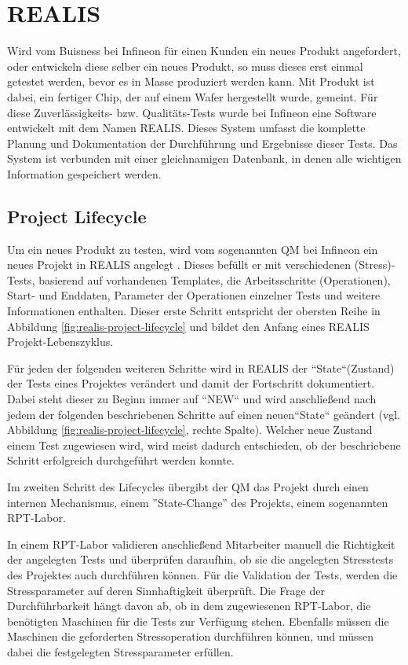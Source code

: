 \section{REALIS}\label{Sec:REALIS}
Wird vom Buisness bei Infineon für einen Kunden ein neues Produkt angefordert, oder entwickeln diese selber ein neues Produkt, so muss dieses erst einmal getestet werden, bevor es in Masse produziert werden kann. Mit Produkt ist dabei, ein fertiger Chip, der auf einem Wafer hergestellt wurde, gemeint. Für diese Zuverlässigkeits- bzw. Qualitäts-Tests wurde bei Infineon eine Software entwickelt mit dem Namen \gls{REALIS}. Dieses System umfasst die komplette Planung und Dokumentation der Durchführung und Ergebnisse dieser Tests. Das System ist verbunden mit einer gleichnamigen Datenbank, in denen alle wichtigen Information gespeichert werden.

\subsection{Project Lifecycle}\label{Subsec:project-lifecycle}
Um ein neues Produkt zu testen, wird vom sogenannten \gls{QM} bei Infineon ein neues Projekt in \gls{REALIS} angelegt . Dieses befüllt er mit verschiedenen (Stress)-Tests, basierend auf vorhandenen Templates, die Arbeitsschritte (Operationen), Start- und Enddaten, Parameter der Operationen einzelner Tests und weitere Informationen enthalten. Dieser erste Schritt entspricht der obersten Reihe in Abbildung \ref{fig:realis-project-lifecycle} und bildet den Anfang eines REALIS Projekt-Lebenszyklus. 

Für jeden der folgenden weiteren Schritte wird in \gls{REALIS} der ``State``(Zustand) der Tests eines Projektes verändert und damit der Fortschritt dokumentiert. Dabei steht dieser zu Beginn immer auf  ``NEW`` und wird anschließend nach jedem der folgenden beschriebenen Schritte auf einen neuen``State`` geändert (vgl. Abbildung \ref{fig:realis-project-lifecycle}, rechte Spalte). Welcher neue Zustand einem Test zugewiesen wird, wird meist dadurch entschieden, ob der beschriebene Schritt erfolgreich durchgeführt werden konnte.

Im zweiten Schritt des Lifecycles übergibt der \gls{QM} das Projekt durch einen internen Mechanismus, einem ''State-Change'' des Projekts, einem sogenannten  \gls{RPT}-Labor. 

In einem \gls{RPT}-Labor validieren anschließend Mitarbeiter manuell die Richtigkeit der angelegten Tests und überprüfen daraufhin, ob sie die angelegten Stresstests des Projektes auch durchführen können. 
Für die Validation der Tests, werden die Stressparameter auf deren Sinnhaftigkeit überprüft. Die Frage der Durchführbarkeit hängt davon ab, ob in dem zugewiesenen \gls{RPT}-Labor, die benötigten Maschinen für die Tests zur Verfügung stehen. Ebenfalls müssen die Maschinen die geforderten Stressoperation durchführen können, und müssen dabei die festgelegten Stressparameter erfüllen.

